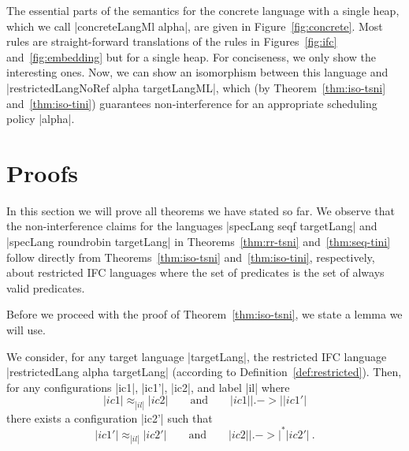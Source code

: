 The essential parts of the semantics for the concrete language
with a single heap,
which we call |concreteLangMl alpha|,
are given in Figure~\ref{fig:concrete}.  Most rules are
straight-forward translations of the rules in Figures~\ref{fig:ifc}
and~\ref{fig:embedding} but for a single heap.  For conciseness, we
only show the interesting ones.
Now, we can show an isomorphism between this language and
|restrictedLangNoRef alpha targetLangML|, which
(by Theorem~\ref{thm:iso-tsni} and~\ref{thm:iso-tini}) guarantees
non-interference for an appropriate scheduling policy |alpha|.



\section{Proofs}
\label{sec:proofs}

In this section we will prove all theorems we have stated so far.
We observe that the non-interference claims for the languages
|specLang seqf targetLang| and |specLang roundrobin targetLang|
in Theorems~\ref{thm:rr-tsni} and~\ref{thm:seq-tini} follow directly
from Theorems~\ref{thm:iso-tsni} and~\ref{thm:iso-tini},
respectively, about restricted IFC languages where the set
of predicates is the set of always valid predicates.

Before we proceed with the proof of Theorem~\ref{thm:iso-tsni},
we state a lemma we will use.

\begin{lemma}
  \label{lemma:rr-tsni-general}
  We consider, for any target language |targetLang|,
  the restricted IFC language |restrictedLang alpha targetLang|
  (according to Definition~\ref{def:restricted}).
  Then,
  for any configurations |ic1|, |ic1'|, |ic2|, and label |il| where
  \begin{equation} \label{eq:tsni-lemma-lhs}
  |ic1| \approx_{|il|} |ic2|
  \qquad \text{and} \qquad
  |ic1| |.->| |ic1'|
  \end{equation}
  there exists a configuration |ic2'| such that
  \begin{equation} \label{eq:tsni-lemma-rhs}
  |ic1'| \approx_{|il|} |ic2'|
  \qquad \text{and} \qquad
  |ic2| |.->|^* |ic2'|
  \ \text{.}
  \end{equation}
\end{lemma}

